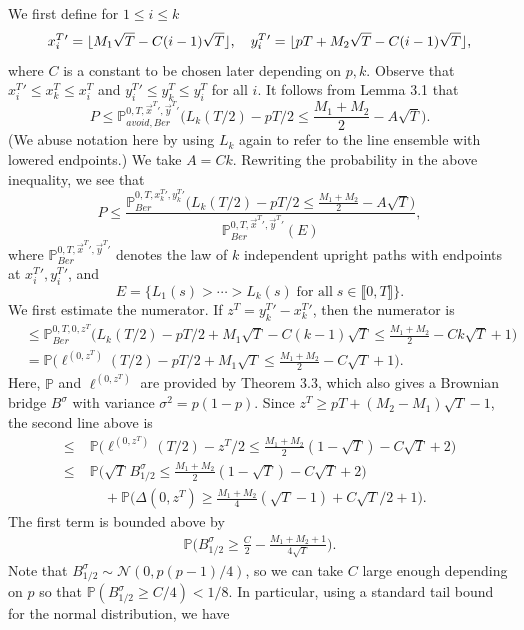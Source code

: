 \documentclass[12pt]{article}
\DeclarePairedDelimiter\floor{\lfloor}{\rfloor}
\begin{document}
	We first define for $1\leq i\leq k$
	\[
	x_i^T{}' = \floor{M_1\sqrt{T} - C(i-1)\sqrt{T}} , \quad y_i^T{}' = \floor{pT + M_2\sqrt{T} - C(i-1)\sqrt{T}} ,
	\]
	where $C$ is a constant to be chosen later depending on $p,k$. Observe that $x_i^T{}' \leq x_k^T \leq x_i^T$ and $y_i^T{}' \leq y_k^T \leq y_i^T$ for all $i$. It follows from Lemma 3.1 that
	\[
	P \leq \mathbb{P}^{0,T,\vec{x}^T{}',\vec{y}^T{}'}_{avoid, Ber} \Big( L_k(T/2) - pT/2 \leq \frac{M_1+M_2}{2} - A\sqrt{T} \Big).
	\]
	(We abuse notation here by using $L_k$ again to refer to the line ensemble with lowered endpoints.) We take $A = Ck$. Rewriting the probability in the above inequality, we see that
	\[
	P \leq \frac{\mathbb{P}^{0,T,x_k^T{}',y_k^T{}'}_{Ber} \Big( L_k(T/2) - pT/2 \leq \frac{M_1+M_2}{2} - A\sqrt{T} \Big)}{\mathbb{P}^{0,T,\vec{x}^T{}',\vec{y}^T{}'}_{Ber}(E)},
	\]
	where $\mathbb{P}^{0,T,\vec{x}^T{}',\vec{y}^T{}'}_{Ber}$ denotes the law of $k$ independent upright paths with endpoints at $x_i^T{}', y_i^T{}'$, and
	\[
	E = \{L_1(s) > \cdots > L_k(s)\;\textrm{for all}\;s \in \llbracket 0, T\rrbracket \}.
	\]
	We first estimate the numerator. If $z^T = y_k^T{}' - x_k^T{}'$, then the numerator is
	\begin{align*}
	& \leq \mathbb{P}^{0,T,0,z^T}_{Ber} \Big( L_k(T/2) - pT/2 + M_1\sqrt{T} - C(k-1)\sqrt{T} \leq \frac{M_1+M_2}{2} - Ck\sqrt{T} + 1\Big) \\
	& = \mathbb{P} \Big( \ell^{(0,z^T)}(T/2) - pT/2 + M_1\sqrt{T} \leq \frac{M_1+M_2}{2} - C\sqrt{T} + 1\Big).
	\end{align*}
	Here, $\mathbb{P}$ and $\ell^{(0,z^T)}$ are provided by Theorem 3.3, which also gives a Brownian bridge $B^{\sigma}$ with variance $\sigma^2 = p(1-p)$. Since $z^T \geq pT + (M_2 - M_1)\sqrt{T} - 1$, the second line above is
	\begin{align*}
	\leq \; & \mathbb{P} \Big( \ell^{(0,z^T)}(T/2) - z^T/2 \leq \frac{M_1+M_2}{2}(1-\sqrt{T}) - C\sqrt{T} + 2\Big)\\
	\leq \; & \mathbb{P} \Big( \sqrt{T}\,B^{\sigma}_{1/2} \leq \frac{M_1+M_2}{2}(1-\sqrt{T}) - C\sqrt{T} + 2\Big)\\
	&\quad + \mathbb{P}\Big(\Delta(0,z^T) \geq \frac{M_1+M_2}{4}(\sqrt{T}-1) + C\sqrt{T}/2 + 1\Big).
	\end{align*}
	The first term is bounded above by
	\begin{align*}
	\mathbb{P} \Big( B^{\sigma}_{1/2} \geq  \frac{C}{2} - \frac{M_1 + M_2 + 1}{4\sqrt{T}}\Big).
	\end{align*}
	Note that $B_{1/2}^{\sigma}\sim\mathcal{N}(0,p(p-1)/4)$, so we can take $C$ large enough depending on $p$ so that $\mathbb{P}(B_{1/2}^{\sigma} \geq C/4) < 1/8$. In particular, using a standard tail bound for the normal distribution, we have
\end{document}
